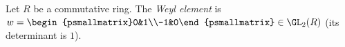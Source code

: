 Let $R$ be a commutative ring. The \emph{Weyl element} is
$w=\begin{psmallmatrix}0&1\\-1&0\end{psmallmatrix}\in\GL_2(R)$ (its determinant is $1$).
